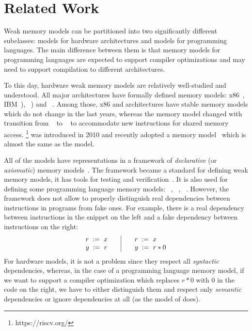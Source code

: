 \section{Related Work}
\label{sec:related}
Weak memory models can be partitioned into two significantly different subclasses:
models for hardware architectures and models for programming languages.
The main difference between them is that memory models for programming languages
are expected to support compiler optimizations and may need to support compilation
to different architectures.

To this day, hardware weak memory models are relatively well-studied and understood.
All major architectures have formally defined memory models:
x86~\cite{Sewell-al:CACM10},
IBM~\POWER \cite{Alglave-DAMP09,Sarkar-al:PLDI11,Alglave-al:TOPLAS14}),
\ARM~\cite{Chong-ASPLOS08, Alglave-DAMP09,Pulte-al:POPL18,Flur-al:POPL16,Alglave-al:TOPLAS14})
and \RISC~\cite{Pulte-al:POPL18}.
Among those, x86 and \POWER architectures have stable memory models which do not change in the last years,
whereas the \ARM memory model changed with transition from ~\cite{Alglave-al:TOPLAS14} to ~\cite{Pulte-al:POPL18}
to accommodate new instructions for shared memory access.
\RISC\footnote{https://riscv.org/} was introduced in 2010 and recently adopted a memory model~\cite{Pulte-al:POPL18}
which is almost the same as the  model.

All of the models have representations in a framework of \emph{declarative} (or \emph{axiomatic})
memory models~\cite{Alglave-al:TOPLAS14}.
The framework became a standard for defining weak memory models, %
it has tools for testing and verification~\cite{Alglave-al:TOPLAS14}.
It is also used for defining some programming language memory models: 
\CPP~\cite{Batty-al:POPL11}, \JS~\cite{Watt-al:PLDI2020}, \OCaml~\cite{Manson-al:POPL05}.
However, the framework does not allow to properly distinguish real dependencies between instructions in programs
from fake ones. For example, there is a real dependency between instructions in the snippet on the left
and a fake dependency between instructions on the right:
\[\begin{array}{l@{\qquad}|@{\qquad}l}
\readInst{}{r}{x} & \readInst{}{r}{x} \\
\writeInst{}{y}{r} & \readInst{}{y}{r * 0} \\
\end{array}\]
For hardware models, it is not a problem since they respect all \emph{syntactic} dependencies,
whereas, in the case of a programming language memory model,
if we want to support a compiler optimization which replaces $r * 0$ with $0$ in the code on the right,
we have to either distinguish them and respect only \emph{semantic} dependencies
or ignore dependencies at all (as the model of \CPP does).

